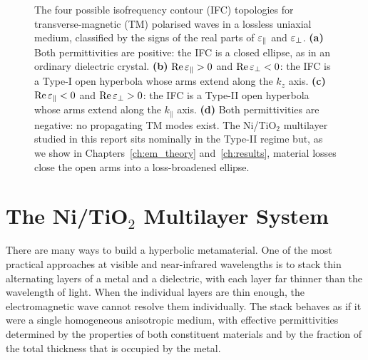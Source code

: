 \begin{figure}[h]
\caption{The four possible isofrequency contour (IFC) topologies for
  transverse-magnetic (TM) polarised waves in a lossless uniaxial medium,
  classified by the signs of the real parts of $\varepsilon_{\parallel}$ and $\varepsilon_{\perp}$.
  \textbf{(a)} Both permittivities are positive: the IFC is a closed ellipse,
  as in an ordinary dielectric crystal.
  \textbf{(b)} $\operatorname{Re}\varepsilon_{\parallel} > 0$ and $\operatorname{Re}\varepsilon_{\perp} < 0$: the IFC is a Type-I open
  hyperbola whose arms extend along the $k_z$ axis.
  \textbf{(c)} $\operatorname{Re}\varepsilon_{\parallel} < 0$ and $\operatorname{Re}\varepsilon_{\perp} > 0$: the IFC is a Type-II open
  hyperbola whose arms extend along the $k_\parallel$ axis.
  \textbf{(d)} Both permittivities are negative: no propagating TM modes exist.
  The Ni/TiO$_2$ multilayer studied in this report sits nominally in the
  Type-II regime but, as we show in Chapters~\ref{ch:em_theory}
  and~\ref{ch:results}, material losses close the open arms into a
  loss-broadened ellipse.}
\label{fig:ch1_ifc_regimes}
\end{figure}

\section{The Ni/TiO\texorpdfstring{$_2$}{2} Multilayer System}

There are many ways to build a hyperbolic metamaterial. One of the most
practical approaches at visible and near-infrared wavelengths is to stack thin
alternating layers of a metal and a dielectric, with each layer far thinner
than the wavelength of light. When the individual layers are thin enough, the
electromagnetic wave cannot resolve them individually. The stack behaves as if
it were a single homogeneous anisotropic medium, with effective permittivities
determined by the properties of both constituent materials and by the fraction
of the total thickness that is occupied by the metal.

